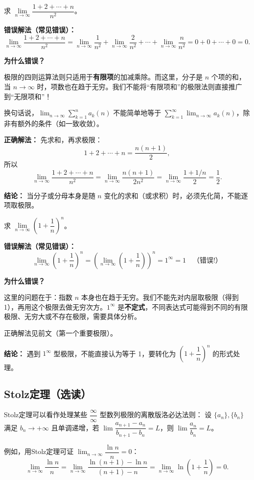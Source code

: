 \documentclass[fontset=fandol]{ctexart}
\newenvironment{extra}{\begin{mdframed}[style=extrastyle, frametitle={* 选读内容（不要求掌握）}]}{\end{mdframed}}
\begin{document}
\begin{example}[错误：滥用极限的四则运算法则]
求 \(\lim\limits_{n\to\infty} \dfrac{1 + 2 + \cdots + n}{n^2}\)。

\textbf{错误解法（常见错误）：}
\[
\lim_{n\to\infty} \dfrac{1 + 2 + \cdots + n}{n^2} = \lim_{n\to\infty} \dfrac{1}{n^2} + \lim_{n\to\infty} \dfrac{2}{n^2} + \cdots + \lim_{n\to\infty} \dfrac{n}{n^2} = 0 + 0 + \cdots + 0 = 0.
\]

\textbf{为什么错误？}

极限的四则运算法则只适用于\textbf{有限项}的加减乘除。而这里，分子是 \(n\) 个项的和，当 \(n \to \infty\) 时，项数也在趋于无穷。我们不能将“有限项和”的极限法则直接推广到“无限项和”！

换句话说，\(\lim_{n\to\infty} \sum_{k=1}^{n} a_k(n)\) 不能简单地等于 \(\sum_{k=1}^{\infty} \lim_{n\to\infty} a_k(n)\)，除非有额外的条件（如一致收敛）。

\textbf{正确解法：}
先求和，再求极限：
\[
1 + 2 + \cdots + n = \dfrac{n(n+1)}{2},
\]
所以
\[
\lim_{n\to\infty} \dfrac{1 + 2 + \cdots + n}{n^2} = \lim_{n\to\infty} \dfrac{n(n+1)}{2n^2} = \lim_{n\to\infty} \dfrac{1 + 1/n}{2} = \dfrac{1}{2}.
\]

\textbf{结论：} 当分子或分母本身是随 \(n\) 变化的求和（或求积）时，必须先化简，不能逐项取极限。
\end{example}

\begin{example}[错误：拆分乘积中的无穷小量]
求 \(\lim\limits_{n\to\infty} \left(1 + \dfrac{1}{n}\right)^n\)。

\textbf{错误解法（常见错误）：}
\[
\lim_{n\to\infty} \left(1 + \dfrac{1}{n}\right)^n = \left(\lim_{n\to\infty} \left(1 + \dfrac{1}{n}\right)\right)^n = 1^\infty = 1 \quad \text{（错误!）}
\]

\textbf{为什么错误？}

这里的问题在于：指数 \(n\) 本身也在趋于无穷。我们不能先对内层取极限（得到 1），再用这个极限去做无穷次方。\(1^\infty\) 是\textbf{不定式}，不同表达式可能得到不同的有限极限、无穷大或不存在极限，需要具体分析。

正确解法见前文（第一个重要极限）。

\textbf{结论：} 遇到 \(1^\infty\) 型极限，不能直接认为等于 1，要转化为 \((1 + \dfrac{1}{n})^n\) 的形式处理。
\end{example}

\fi

\begin{extra}
\subsection*{Stolz定理（选读）}

Stolz定理可以看作处理某些 \(\dfrac{\infty}{\infty}\) 型数列极限的离散版洛必达法则：
设 \(\{a_n\}, \{b_n\}\) 满足 \(b_n \to +\infty\) 且单调递增，若 \(\lim \dfrac{a_{n+1}-a_n}{b_{n+1}-b_n} = L\)，则 \(\lim \dfrac{a_n}{b_n} = L\)。

例如，用Stolz定理可证 \(\lim_{n\to\infty} \dfrac{\ln n}{n} = 0\)：
\[
\lim_{n\to\infty} \dfrac{\ln n}{n} = \lim_{n\to\infty} \dfrac{\ln(n+1) - \ln n}{(n+1)-n} = \lim_{n\to\infty} \ln\left(1+\dfrac{1}{n}\right) = 0.
\]
\end{extra}
\end{document}
